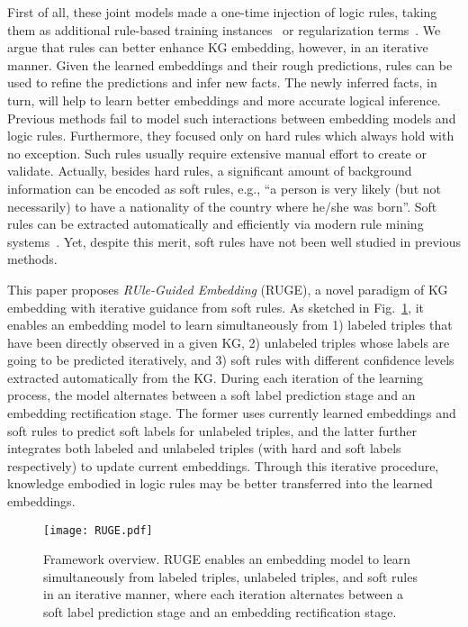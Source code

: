 \documentclass[letterpaper]{article} \usepackage{aaai18}  \usepackage{times}  \usepackage{helvet}  \usepackage{courier}  \usepackage{url}  \usepackage{graphicx}  \usepackage{amsmath}
\begin{document}
First of all, these joint models made a one-time injection of logic rules, taking them as additional rule-based training instances~\cite{rocktaschel2015:EmbedLogic} or regularization terms~\cite{demeester2016:LiftedRule}. We argue that rules can better enhance KG embedding, however, in an iterative manner. Given the learned embeddings and their rough predictions, rules can be used to refine the predictions and infer new facts. The newly inferred facts, in turn, will help to learn better embeddings and more accurate logical inference. Previous methods fail to model such interactions between embedding models and logic rules. Furthermore, they focused only on hard rules which always hold with no exception. Such rules usually require extensive manual effort to create or validate. Actually, besides hard rules, a significant amount of background information can be encoded as soft rules, e.g., ``a person is very likely (but not necessarily) to have a nationality of the country where he/she was born''. Soft rules can be extracted automatically and efficiently via modern rule mining systems~\cite{galarraga2013:AMIE,galarraga2015:AMIE+}. Yet, despite this merit, soft rules have not been well studied in previous methods.

This paper proposes \textit{RUle-Guided Embedding} (RUGE), a novel paradigm of KG embedding with iterative guidance from soft rules. As sketched in Fig.~\ref{fig:RUGE}, it enables an embedding model to learn simultaneously from 1) labeled triples that have been directly observed in a given KG, 2) unlabeled triples whose labels are going to be predicted iteratively, and 3) soft rules with different confidence levels extracted automatically from the KG. During each iteration of the learning process, the model alternates between a soft label prediction stage and an embedding rectification stage. The former uses currently learned embeddings and soft rules to predict soft labels for unlabeled triples, and the latter further integrates both labeled and unlabeled triples (with hard and soft labels respectively) to update current embeddings. Through this iterative procedure, knowledge embodied in logic rules may be better transferred into the learned embeddings.

\begin{figure}[t]
\centering
  \texttt{[image: RUGE.pdf]}
  \caption{Framework overview. RUGE enables an embedding model to learn simultaneously from labeled triples, unlabeled triples, and soft rules in an iterative manner, where each iteration alternates between a soft label prediction stage and an embedding rectification stage.}\label{fig:RUGE}
\end{figure}
\end{document}
